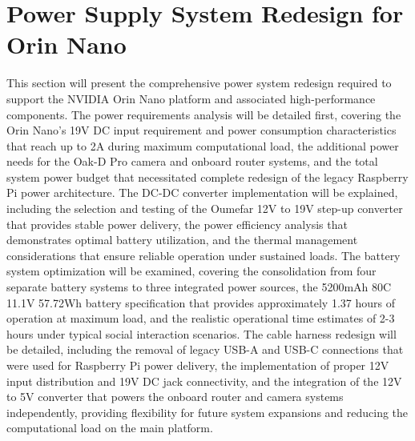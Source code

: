 \section{Power Supply System Redesign for Orin Nano}
This section will present the comprehensive power system redesign required to support the NVIDIA Orin Nano platform and associated high-performance components. The power requirements analysis will be detailed first, covering the Orin Nano's 19V DC input requirement and power consumption characteristics that reach up to 2A during maximum computational load, the additional power needs for the Oak-D Pro camera and onboard router systems, and the total system power budget that necessitated complete redesign of the legacy Raspberry Pi power architecture. The DC-DC converter implementation will be explained, including the selection and testing of the Oumefar 12V to 19V step-up converter that provides stable power delivery, the power efficiency analysis that demonstrates optimal battery utilization, and the thermal management considerations that ensure reliable operation under sustained loads. The battery system optimization will be examined, covering the consolidation from four separate battery systems to three integrated power sources, the 5200mAh 80C 11.1V 57.72Wh battery specification that provides approximately 1.37 hours of operation at maximum load, and the realistic operational time estimates of 2-3 hours under typical social interaction scenarios. The cable harness redesign will be detailed, including the removal of legacy USB-A and USB-C connections that were used for Raspberry Pi power delivery, the implementation of proper 12V input distribution and 19V DC jack connectivity, and the integration of the 12V to 5V converter that powers the onboard router and camera systems independently, providing flexibility for future system expansions and reducing the computational load on the main platform.

